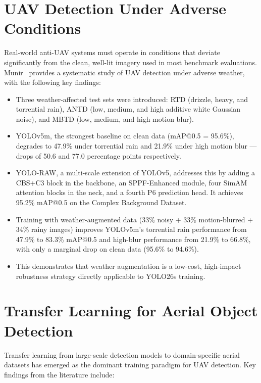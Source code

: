 \documentclass[12pt,a4paper]{report}
\begin{document}
\section{UAV Detection Under Adverse Conditions}

Real-world anti-UAV systems must operate in conditions that deviate
significantly from the clean, well-lit imagery used in most benchmark
evaluations. Munir~\cite{munir2023kfupm} provides a systematic
study of UAV detection under adverse weather, with the following key findings:

\begin{itemize}
  \item Three weather-affected test sets were introduced: RTD (drizzle, heavy, and torrential rain),
        ANTD (low, medium, and high additive white Gaussian noise), and MBTD (low, medium, and high
        motion blur).
  \item YOLOv5m, the strongest baseline on clean data (mAP@0.5 = 95.6\%), degrades to 47.9\% under
        torrential rain and 21.9\% under high motion blur --- drops of 50.6 and 77.0 percentage
        points respectively.
  \item YOLO-RAW, a multi-scale extension of YOLOv5, addresses this by adding a CBS+C3 block in the
        backbone, an SPPF-Enhanced module, four SimAM attention blocks in the neck, and a fourth P6
        prediction head. It achieves 95.2\% mAP@0.5 on the Complex Background Dataset.
  \item Training with weather-augmented data (33\% noisy + 33\% motion-blurred + 34\% rainy images)
        improves YOLOv5m's torrential rain performance from 47.9\% to 83.3\% mAP@0.5 and high-blur
        performance from 21.9\% to 66.8\%, with only a marginal drop on clean data (95.6\% to 94.6\%).
  \item This demonstrates that weather augmentation is a low-cost, high-impact robustness strategy
        directly applicable to YOLO26s training.
\end{itemize}

\section{Transfer Learning for Aerial Object Detection}

Transfer learning from large-scale detection models to domain-specific
aerial datasets has emerged as the dominant training paradigm for UAV
detection. Key findings from the literature include:
\end{document}

